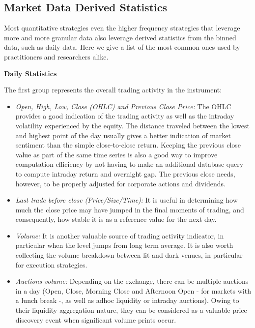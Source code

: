 \subsection{Market Data Derived Statistics}

Most quantitative strategies even the higher frequency strategies that leverage more and more granular data also leverage derived statistics from the binned data, such as daily data. Here we give a list of the most common ones used by practitioners and researchers alike. \twomedskip


\noindent\textbf{Daily Statistics} \twomedskip

The first group represents the overall trading activity in the instrument: 

\begin{itemize}
\item \emph{Open, High, Low, Close (OHLC) and Previous Close Price:} The OHLC provides a good indication of the trading activity as well as the intraday volatility experienced by the equity. The distance traveled between the lowest and highest point of the day usually gives a better indication of market sentiment than the simple close-to-close return. Keeping the previous close value as part of the same time series is also a good way to improve computation efficiency by not having to make an additional database query to compute intraday return and overnight gap. The previous close needs, however, to be properly adjusted for corporate actions and dividends. 


\item \emph{Last trade before close (Price/Size/Time):} It is useful in determining how much the close price may have jumped in the final moments of trading, and consequently, how stable it is as a reference value for the next day.


\item \emph{Volume:} It is another valuable source of trading activity indicator, in particular when the level jumps from long term average. It is also worth collecting the volume breakdown between lit and dark venues, in particular for execution strategies.


\item \emph{Auctions volume:} Depending on the exchange, there can be multiple auctions in a day (Open, Close, Morning Close and Afternoon Open - for markets with a lunch break -, as well as adhoc liquidity or intraday auctions). Owing to their liquidity aggregation nature, they can be considered as a valuable price discovery event when significant volume prints occur.



\end{itemize}
